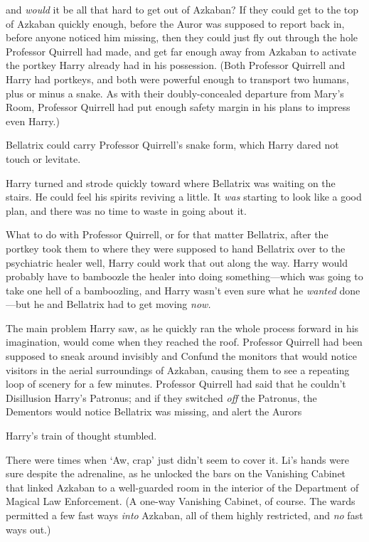 {\el} and \emph{would} it be all that hard to get out of Azkaban? If they
could get to the top of Azkaban quickly enough, before the Auror was supposed
to report back in, before anyone noticed him missing, then they could just fly
out through the hole Professor Quirrell had made, and get far enough away from
Azkaban to activate the portkey Harry already had in his possession. (Both
Professor Quirrell and Harry had portkeys, and both were powerful enough to
transport two humans, plus or minus a snake. As with their doubly-concealed
departure from Mary's Room, Professor Quirrell had put enough safety margin in
his plans to impress even Harry.)

Bellatrix could carry Professor Quirrell's snake form, which Harry dared not
touch or levitate.

Harry turned and strode quickly toward where Bellatrix was waiting on the
stairs. He could feel his spirits reviving a little. It \emph{was} starting to
look like a good plan, and there was no time to waste in going about it.

What to do with Professor Quirrell, or for that matter Bellatrix, after the
portkey took them to where they were supposed to hand Bellatrix over to the
psychiatric healer{\el} well, Harry could work that out along the way. Harry
would probably have to bamboozle the healer into doing something—which was
going to take one hell of a bamboozling, and Harry wasn't even sure what he
\emph{wanted} done—but he and Bellatrix had to get moving \emph{now.}

The main problem Harry saw, as he quickly ran the whole process forward in his
imagination, would come when they reached the roof. Professor Quirrell had been
supposed to sneak around invisibly and Confund the monitors that would notice
visitors in the aerial surroundings of Azkaban, causing them to see a repeating
loop of scenery for a few minutes. Professor Quirrell had said that he couldn't
Disillusion Harry's Patronus; and if they switched \emph{off} the Patronus, the
Dementors would notice Bellatrix was missing, and alert the Aurors{\el}

Harry's train of thought stumbled.

There were times when `Aw, crap' just didn't seem to cover it.
\sbreak
Li's hands were sure despite the adrenaline, as he unlocked the bars on the
Vanishing Cabinet that linked Azkaban to a well-guarded room in the interior of
the Department of Magical Law Enforcement. (A one-way Vanishing Cabinet, of
course. The wards permitted a few fast ways \emph{into} Azkaban, all of them
highly restricted, and \emph{no} fast ways out.)

